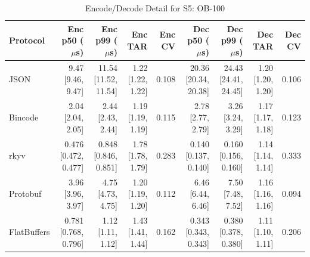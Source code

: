 \begin{table}[htbp]
\centering
\caption{Encode/Decode Detail for S5: OB-100}
\label{tab:detail_book_large}
\begin{tabular}{l r r r r r r r r}
\hline
Protocol & Enc p50 ($\mu$s) & Enc p99 ($\mu$s) & Enc TAR & Enc CV & Dec p50 ($\mu$s) & Dec p99 ($\mu$s) & Dec TAR & Dec CV \\
\hline
  JSON & 9.47 [9.46, 9.47] & 11.54 [11.52, 11.54] & 1.22 [1.22, 1.22] & 0.108 & 20.36 [20.34, 20.38] & 24.43 [24.41, 24.45] & 1.20 [1.20, 1.20] & 0.106 \\
  Bincode & 2.04 [2.04, 2.05] & 2.44 [2.43, 2.44] & 1.19 [1.19, 1.19] & 0.115 & 2.78 [2.77, 2.79] & 3.26 [3.24, 3.29] & 1.17 [1.17, 1.18] & 0.123 \\
  rkyv & 0.476 [0.472, 0.477] & 0.848 [0.846, 0.851] & 1.78 [1.78, 1.79] & 0.283 & 0.140 [0.137, 0.140] & 0.160 [0.156, 0.160] & 1.14 [1.14, 1.14] & 0.333 \\
  Protobuf & 3.96 [3.96, 3.97] & 4.75 [4.73, 4.75] & 1.20 [1.19, 1.20] & 0.112 & 6.46 [6.44, 6.46] & 7.50 [7.48, 7.52] & 1.16 [1.16, 1.16] & 0.094 \\
  FlatBuffers & 0.781 [0.768, 0.796] & 1.12 [1.11, 1.12] & 1.43 [1.41, 1.44] & 0.162 & 0.343 [0.343, 0.343] & 0.380 [0.378, 0.380] & 1.11 [1.10, 1.11] & 0.206 \\
\hline
\end{tabular}
\end{table}